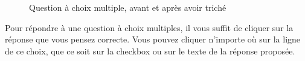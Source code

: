 \documentclass[11pt]{scrreprt}
\begin{document}
\begin{figure}[H]
{        }
        \caption{Question à choix multiple, avant et après avoir triché}
    \end{figure}

    Pour répondre à une question à choix multiples, il vous suffit de cliquer sur la réponse que vous pensez correcte. Vous pouvez cliquer n'importe où sur la ligne de ce choix, que ce soit sur la checkbox ou sur le texte de la réponse proposée.\\
\end{document}
